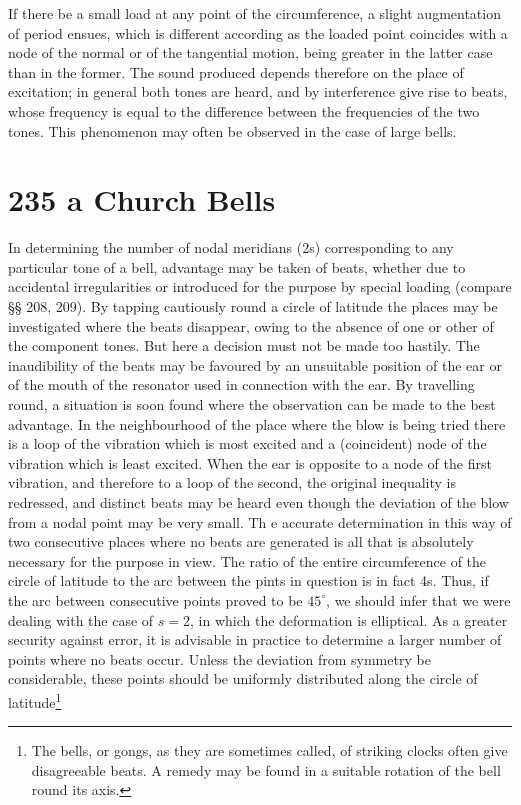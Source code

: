If there be a small load at any point of the circumference, a slight
augmentation of period ensues, which is different according as the
loaded point coincides with a node of the normal or of the tangential
motion, being greater in the latter case than in the former. The sound
produced depends therefore on the place of excitation; in general both
tones are heard, and by interference give rise to beats, whose frequency
is equal to the difference between the frequencies of the two tones.
This phenomenon may often be observed in the case of large bells.


\section{235 a Church Bells}
In determining the number of nodal meridians (2s) corresponding to any
particular tone of a bell, advantage may be taken of beats, whether due to
accidental irregularities or introduced for the purpose by special loading
(compare §§ 208, 209). By tapping cautiously round a circle of latitude the
places may be investigated where the beats disappear, owing to the absence of
one or other of the component tones. But here a decision must not be made too
hastily. The inaudibility of the beats may be favoured by an unsuitable
position of the ear or of the mouth of the resonator used in connection with
the ear. By travelling round, a situation is soon found where the observation
can be made to the best advantage. In the neighbourhood of the place where the
blow is being tried there is a loop of the vibration which is most excited and
a (coincident) node of the vibration which is least excited. When the ear is
opposite to a node of the first vibration, and therefore to a loop of the
second, the original inequality is redressed, and distinct beats may be heard
even though the deviation of the blow from a nodal point may be very small. Th
e accurate determination in this way of two consecutive places where no beats
are generated is all that is absolutely necessary for the purpose in view. The
ratio of the entire circumference of the circle of latitude to the arc between
the pints in question is in fact 4s.  Thus, if the arc between consecutive points
proved to be \(45^{\circ}\), we should infer that we were dealing with the case
of \(s=2\), in which the deformation is elliptical. As a greater security
against error, it is advisable in practice to determine a larger number of points
where no beats occur. Unless the deviation from symmetry be considerable, these
points should be uniformly distributed along the circle of latitude\footnote{The
bells, or gongs, as they are sometimes called, of striking clocks often give
disagreeable beats. A remedy may be found in a suitable rotation of the bell
round its axis.}

